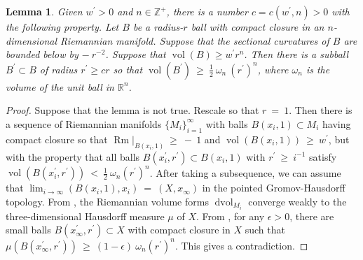 \documentclass[12pt]{amsart}
\newcommand{\dvol}{\operatorname{dvol}}
\newcommand{\R}{{\mathbb R}}
\newcommand{\Rm}{\operatorname{Rm}}
\newcommand{\vol}{\operatorname{vol}}
\newcommand{\Z}{{\mathbb Z}}
\numberwithin{equation}{section}
\theoremstyle{plain}
\newtheorem{lemma}[equation]{Lemma}
\theoremstyle{definition}
\theoremstyle{remark}
\begin{document}
\begin{lemma} \label{Alexlemma}
Given $w^\prime > 0$ and $n \in \Z^+$, there is a number $c = c(w^\prime,n) > 0$ with the
following property.
Let $B$ be a radius-$r$ ball with compact closure in an $n$-dimensional Riemannian 
manifold. Suppose that the sectional curvatures of $B$ are bounded below by
$- \: r^{-2}$.
Suppose that $\vol(B) \ge w^\prime r^n$. Then there is a subball $B^\prime \subset B$ of
radius $r^\prime \ge cr$ so that $\vol(B^\prime) \: \ge \: \frac12 \: \omega_n \:
(r^\prime)^n$, where $\omega_n$ is the volume of the unit ball in $\R^n$.
\end{lemma}
\begin{proof}
Suppose that the lemma is not true. Rescale
so that $r \: = \: 1$. Then there is a sequence of Riemannian
manifolds $\{M_i\}_{i=1}^\infty$ with balls $B(x_i, 1) \subset M_i$
having compact closure
so that $\Rm \Big|_{B(x_i, 1)} \: \ge \: - \: 1$ and
$\vol(B(x_i, 1)) \: \ge \: w^\prime$, but with the property that all balls
$B(x_i^\prime, r^\prime) \subset B(x_i, 1)$ with $r^\prime \: \ge \:
i^{-1}$ satisfy
$\vol(B(x_i^\prime, r^\prime)) \: < \: \frac{1}{2} \: \omega_n 
(r^\prime)^n$. After taking a subsequence, we can assume that
$\lim_{i \rightarrow \infty} (B(x_i, 1), x_i) \: = \: (X, x_\infty)$ in the
pointed Gromov-Hausdorff topology. From
\cite[Theorem 10.8]{Burago-Gromov-Perelman}, the Riemannian volume
forms $\dvol_{M_i}$ converge weakly to the three-dimensional Hausdorff
measure $\mu$ of $X$. From \cite[Corollary 6.7 and 
Section 9]{Burago-Gromov-Perelman}, for any $\epsilon > 0$, 
there are small balls $B(x_\infty^\prime,
r^\prime) \subset X$ with compact closure in $X$ such that $\mu(B(x_\infty^\prime,
r^\prime)) \: \ge \: (1-\epsilon) \: \omega_n (r^\prime)^n$.
This gives a contradiction.
\end{proof}
\end{document}
